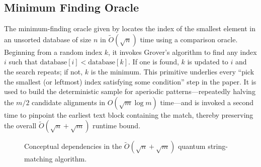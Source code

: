 \documentclass[12pt]{IEEEtran}
\begin{document}
\subsection{Minimum Finding Oracle}
The minimum-finding oracle given by \cite[Durr \& Høyer]{durr1999quantumalgorithmfindingminimum} locates the index of the smallest element in an unsorted database of size \(n\) in \(\widetilde{O}(\sqrt{n})\) time using a comparison oracle. Beginning from a random index \(k\), it invokes Grover's algorithm to find any index \(i\) such that \(\text{database}[i]<\text{database}[k]\). If one is found, \(k\) is updated to \(i\) and the search repeats; if not, \(k\) is the minimum. This primitive underlies every ``pick the smallest (or leftmost) index satisfying some condition'' step in the paper. It is used to build the deterministic sample for aperiodic patterns—repeatedly halving the \(m/2\) candidate alignments in \({O}(\sqrt{m}\log m)\) time—and is invoked a second time to pinpoint the earliest text block containing the match, thereby preserving the overall \(\widetilde{O}(\sqrt{n}+\sqrt{m})\) runtime bound.

\begin{figure*}[!t]
    \centering
    \caption{Conceptual dependencies in the $\widetilde{O}(\sqrt{n}+\sqrt{m})$ quantum string-matching algorithm.}
    \label{fig:quantum-string-matching}
\end{figure*}
\end{document}
